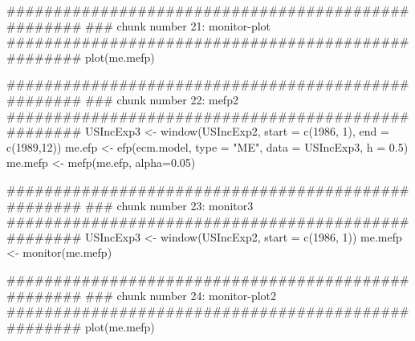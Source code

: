 \begin{Examples}
\begin{ExampleCode}
###################################################
### chunk number 21: monitor-plot
###################################################
plot(me.mefp)

###################################################
### chunk number 22: mefp2
###################################################
USIncExp3 <- window(USIncExp2, start = c(1986, 1), end = c(1989,12))
me.efp <- efp(ecm.model, type = "ME", data = USIncExp3, h = 0.5)
me.mefp <- mefp(me.efp, alpha=0.05)

###################################################
### chunk number 23: monitor3
###################################################
USIncExp3 <- window(USIncExp2, start = c(1986, 1))
me.mefp <- monitor(me.mefp)

###################################################
### chunk number 24: monitor-plot2
###################################################
plot(me.mefp)

\end{ExampleCode}
\end{Examples}


